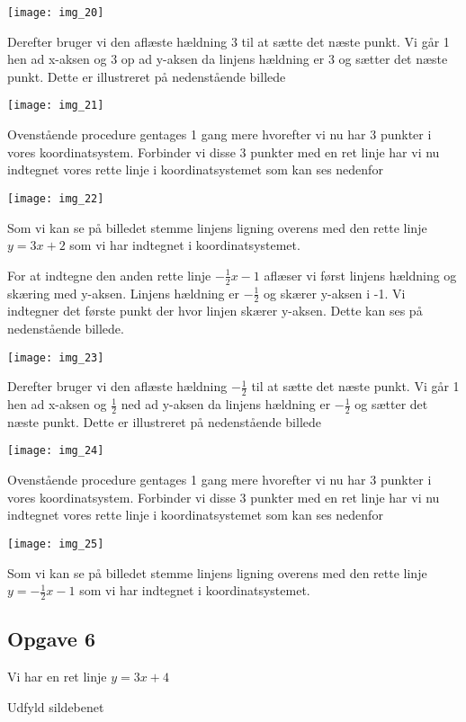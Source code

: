 \texttt{[image: img\_20]}


Derefter bruger vi den aflæste hældning 3 til at sætte det næste punkt. Vi går 1 hen ad x-aksen og 3 op ad y-aksen da linjens hældning er 3 og sætter det næste punkt. Dette er illustreret på nedenstående billede

\texttt{[image: img\_21]}

Ovenstående procedure gentages 1 gang mere hvorefter vi nu har 3 punkter i vores koordinatsystem. Forbinder vi disse 3 punkter med en ret linje har vi nu indtegnet vores rette linje i koordinatsystemet som kan ses nedenfor

\texttt{[image: img\_22]}

Som vi kan se på billedet stemme linjens ligning overens med den rette linje $y=3x+2$ som vi har indtegnet i koordinatsystemet.


For at indtegne den anden rette linje $-\frac{1}{2}x-1$ aflæser vi først linjens hældning og skæring med y-aksen. Linjens hældning er $-\frac{1}{2}$ og skærer y-aksen i -1. Vi indtegner det første punkt der hvor linjen skærer y-aksen. Dette kan ses på nedenstående billede.

\texttt{[image: img\_23]}

Derefter bruger vi den aflæste hældning $-\frac{1}{2}$ til at sætte det næste punkt. Vi går 1 hen ad x-aksen og $\frac{1}{2}$ ned ad y-aksen da linjens hældning er $-\frac{1}{2}$ og sætter det næste punkt. Dette er illustreret på nedenstående billede

\texttt{[image: img\_24]}

Ovenstående procedure gentages 1 gang mere hvorefter vi nu har 3 punkter i vores koordinatsystem. Forbinder vi disse 3 punkter med en ret linje har vi nu indtegnet vores rette linje i koordinatsystemet som kan ses nedenfor

\texttt{[image: img\_25]}

Som vi kan se på billedet stemme linjens ligning overens med den rette linje $y=- \frac{1}{2}x-1$ som vi har indtegnet i koordinatsystemet.





\subsection{Opgave 6}

Vi har en ret linje $y = 3x+4$

Udfyld sildebenet

